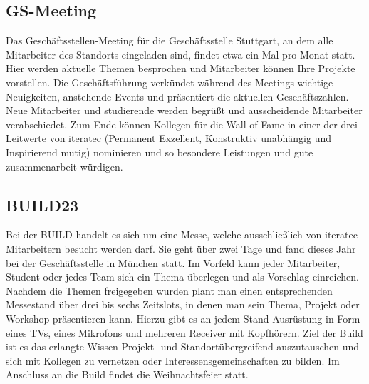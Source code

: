 \subsection{GS-Meeting}
Das Geschäftsstellen-Meeting für die Geschäftsstelle Stuttgart, an dem alle Mitarbeiter des Standorts eingeladen sind,
findet etwa ein Mal pro Monat statt. Hier werden aktuelle Themen besprochen und Mitarbeiter können Ihre Projekte
vorstellen. Die Geschäftsführung verkündet während des Meetings wichtige Neuigkeiten, anstehende Events und präsentiert
die aktuellen Geschäftszahlen. Neue Mitarbeiter und studierende werden begrüßt und ausscheidende Mitarbeiter
verabschiedet. Zum Ende können Kollegen für die Wall of Fame in einer der drei Leitwerte von iteratec (Permanent
Exzellent, Konstruktiv unabhängig und Inspirierend mutig) nominieren und so besondere Leistungen und gute zusammenarbeit
würdigen.

\subsection{BUILD23}
Bei der BUILD handelt es sich um eine Messe, welche ausschließlich von iteratec Mitarbeitern besucht werden darf. Sie
geht über zwei Tage und fand dieses Jahr bei der Geschäftsstelle in München statt. Im Vorfeld kann jeder Mitarbeiter,
Student oder jedes Team sich ein Thema überlegen und als Vorschlag einreichen. Nachdem die Themen freigegeben wurden
plant man einen entsprechenden Messestand über drei bis sechs Zeitslots, in denen man sein Thema, Projekt oder Workshop
präsentieren kann. Hierzu gibt es an jedem Stand Ausrüstung in Form eines TVs, eines Mikrofons und mehreren Receiver mit
Kopfhörern. Ziel der Build ist es das erlangte Wissen Projekt- und Standortübergreifend auszutauschen und sich mit
Kollegen zu vernetzen oder Interessensgemeinschaften zu bilden. Im Anschluss an die Build findet die Weihnachtsfeier
statt.

%


